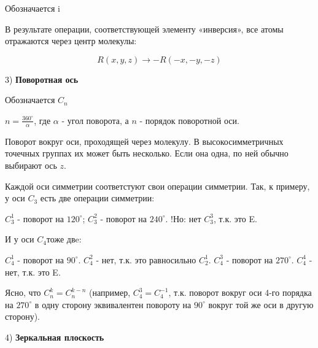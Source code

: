 Обозначается i

\par\smallskip

В результате операции, соответствующей элементу «инверсия»,
все атомы отражаются через центр молекулы:

$$R(x,y,z) \longrightarrow -R(-x,-y,-z)$$

3) \textbf{Поворотная ось}

\par\smallskip

Обозначается $C_n$

\par\smallskip

$n=\frac{360^\circ}{\alpha}$, где $\alpha$ - угол поворота, а $n$ - порядок поворотной оси.

\par\smallskip

Поворот вокруг оси, проходящей через молекулу. В
высокосимметричных точечных группах их может быть несколько.
Если она одна, по ней обычно выбирают ось $z$.

\par\smallskip

Каждой оси симметрии соответстуют свои операции симметрии.
Так, к примеру, у оси $C_3$ есть две операции симметрии:

\par\smallskip

$C_3^1$ - поворот на $120^\circ$; $C_3^2$ - поворот на $240^\circ$. !Но: нет   $C_3^3$, т.к. это E.

\par\smallskip

И у оси $C_4$тоже двe:

\par\smallskip

$C_4^1$ - поворот на $90^\circ$.  $C_4^2$ - нет, т.к. это равносильно $C_2^1$. $C_4^3$ - поворот на $270^\circ$. $C_4^4$ - нет, т.к. это E.

\par\smallskip

Ясно, что $C_n^k = C_n^{k-n}$ (например, $C_4^3 = C_4^{-1}$, т.к. поворот вокруг оси 4-го порядка на $270^\circ$ в одну сторону эквивалентен повороту на $90^\circ$ вокруг той же оси в другую сторону).

\par\smallskip
	
4) \textbf{Зеркальная плоскость}

\par\smallskip

